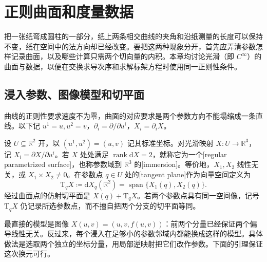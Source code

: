 
% 
% 

\section{正则曲面和度量数据}
\label{g1:sec:0801}

把一张纸弯成圆柱的一部分，纸上两条相交曲线的夹角和沿纸测量的长度可以保持不变，纸在空间中的法方向却已经改变。要把这两种现象分开，首先应弄清参数怎样记录曲面，以及哪些计算只需两个切向量的内积。本章均讨论光滑（即 \(C^\infty\)）的曲面与数据，以便在交换求导次序和求解标架方程时使用同一正则性条件。

\subsection{浸入参数、图像模型和切平面}
\label{g1:subsec:0801:01}

曲线的正则性要求速度不为零，曲面的对应要求是两个参数方向不能塌缩成一条直线。以下记 \(u^1=u,u^2=v\)，\(\partial_i=\partial/\partial u^i\)，\(X_i=\partial_iX\)。

\begin{definition}\label{g1:def:surface-immersion}
	设 \(U\subseteq\mathbb R^2\) 开，以 \((u^1,u^2)=(u,v)\) 记其标准坐标。对光滑映射 \(X:U\rightarrow\mathbb R^3\)，记 \(X_i=\partial X/\partial u^i\)。若 \(X\) 处处满足 \(\operatorname{rank}\mathrm{d}X=2\)，就称它为一个[regular parametrized surface]，也称参数域到 \(\mathbb R^3\) 的[immersion]。等价地，\(X_1,X_2\) 线性无关，或 \(X_1\times X_2\ne0\)。在参数点 \(q\in U\) 处的[tangent plane]作为向量空间定义为
	\[
		\mathrm{T}_qX\coloneqq \mathrm{d}X_q(\mathbb R^2)=\operatorname{span}\{X_1(q),X_2(q)\}.
	\]
	经过曲面点的仿射切平面是 \(X(q)+\mathrm{T}_qX\)。若两个参数点具有同一空间像，记号 \(\mathrm{T}_qX\) 仍记录所选参数点，而不擅自把两个分支的切平面等同。
\end{definition}

最直接的模型是图像 \(X(u,v)=(u,v,f(u,v))\)：前两个分量已经保证两个偏导线性无关。反过来，每个浸入在足够小的参数邻域内都能换成这样的模型。具体做法是选取两个独立的坐标分量，用局部逆映射把它们改作参数。下面的引理保证这次换元可行。

